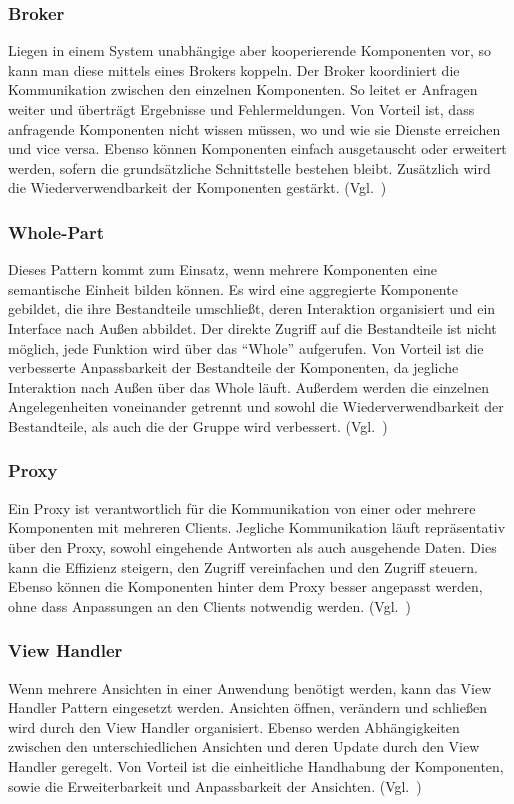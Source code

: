 \subsubsection{Broker}
Liegen in einem System unabhängige aber kooperierende Komponenten vor, so kann man diese mittels eines Brokers koppeln.
Der Broker koordiniert die Kommunikation zwischen den einzelnen Komponenten.
So leitet er Anfragen weiter und überträgt Ergebnisse und Fehlermeldungen.
Von Vorteil ist, dass anfragende Komponenten nicht wissen müssen, wo und wie sie Dienste erreichen und vice versa.
Ebenso können Komponenten einfach ausgetauscht oder erweitert werden, sofern die grundsätzliche Schnittstelle bestehen bleibt.
Zusätzlich wird die Wiederverwendbarkeit der Komponenten gestärkt.
(Vgl.~\cite{buschmann-pattern-oriented-software-architecture})

\subsubsection{Whole-Part}
Dieses Pattern kommt zum Einsatz, wenn mehrere Komponenten eine semantische Einheit bilden können.
Es wird eine aggregierte Komponente gebildet, die ihre Bestandteile umschließt, deren Interaktion organisiert und ein Interface nach Außen abbildet.
Der direkte Zugriff auf die Bestandteile ist nicht möglich, jede Funktion wird über das \enquote{Whole} aufgerufen.
Von Vorteil ist die verbesserte Anpassbarkeit der Bestandteile der Komponenten, da jegliche Interaktion nach Außen über das Whole läuft.
Außerdem werden die einzelnen Angelegenheiten voneinander getrennt und sowohl die Wiederverwendbarkeit der Bestandteile, als auch die der Gruppe wird verbessert.
(Vgl.~\cite{buschmann-pattern-oriented-software-architecture})

\subsubsection{Proxy}
Ein Proxy ist verantwortlich für die Kommunikation von einer oder mehrere Komponenten mit mehreren Clients.
Jegliche Kommunikation läuft repräsentativ über den Proxy, sowohl eingehende Antworten als auch ausgehende Daten.
Dies kann die Effizienz steigern, den Zugriff vereinfachen und den Zugriff steuern.
Ebenso können die Komponenten hinter dem Proxy besser angepasst werden, ohne dass Anpassungen an den Clients notwendig werden.
(Vgl.~\cite{buschmann-pattern-oriented-software-architecture})

\subsubsection{View Handler}
Wenn mehrere Ansichten in einer Anwendung benötigt werden, kann das View Handler Pattern eingesetzt werden.
Ansichten öffnen, verändern und schließen wird durch den View Handler organisiert.
Ebenso werden Abhängigkeiten zwischen den unterschiedlichen Ansichten und deren Update durch den View Handler geregelt.
Von Vorteil ist die einheitliche Handhabung der Komponenten, sowie die Erweiterbarkeit und Anpassbarkeit der Ansichten.
(Vgl.~\cite{buschmann-pattern-oriented-software-architecture})

